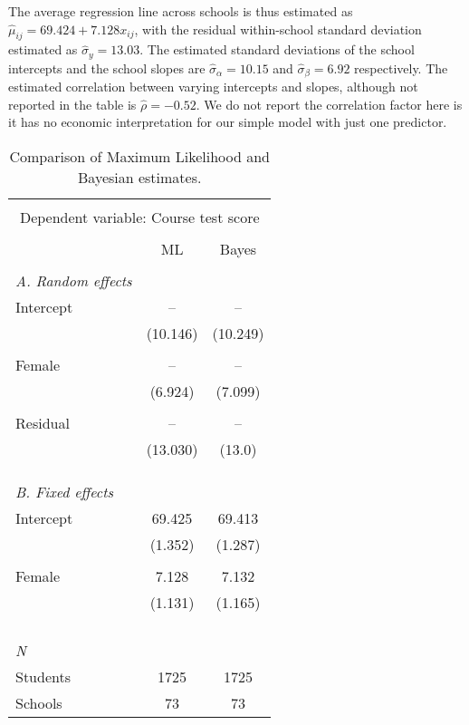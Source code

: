 The average regression line across schools is thus estimated as $\hat{\mu}_{ij} = 69.424 + 7.128 x_{ij}$, with the residual within-school standard deviation estimated as $\hat{\sigma}_{y}=13.03$. The estimated standard deviations of the school intercepts and the school slopes are $\hat{\sigma}_{\alpha}= 10.15$ and $\hat{\sigma}_{\beta}=6.92$ respectively. The estimated correlation between varying intercepts and slopes, although not reported in the table is $\hat{\rho} = -0.52$. We do not report the correlation factor here is it has no economic interpretation for our simple model with just one predictor.

\begin{table}[H]
	\centering 
	\caption{{\small Comparison of Maximum Likelihood and Bayesian estimates.}} 
	\label{}
	
	\smallskip
	\begin{tabular}{l*{2}{c}}
		\toprule \\[-1.0em]
		\multicolumn{3}{c}{Dependent variable: Course test score}\\ \\[-1.0em]
		&ML &Bayes\\ 
		\midrule \\[-1.0em]
		\emph{A. Random effects} \\
		Intercept & -- & --\\
		& (10.146) & (10.249)\\ \\[-1.0em]
		Female & -- & --\\
		& (6.924) & (7.099)\\ \\[-1.0em]
		Residual & -- & --\\
		& (13.030) & (13.0)\\ \\[-1.0em]
		\\ \\[-1.0em]\emph{B. Fixed effects} \\
		Intercept & 69.425 & 69.413\\
		& (1.352) & (1.287)\\ \\[-1.0em]
		Female & 7.128 & 7.132\\
		& (1.131) & (1.165)\\ \\[-1.0em]
		\\ \\[-1.0em]\hline \\[-1.0em]
		\emph{N} \\
		\hspace{3mm}Students&1725&1725\\
		\hspace{3mm}Schools&73&73\\
		\bottomrule
		
	\end{tabular} 
\label{tab:results}
\end{table}
